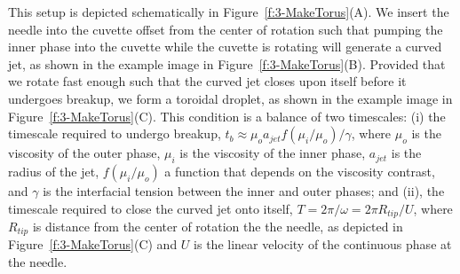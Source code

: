 This setup is depicted schematically in Figure~\ref{f:3-MakeTorus}(A).
We insert the needle into the cuvette offset from the center of rotation such that pumping the inner phase into the cuvette while the cuvette is rotating will generate a curved jet, as shown in the example image in Figure~\ref{f:3-MakeTorus}(B).
Provided that we rotate fast enough such that the curved jet closes upon itself before it undergoes breakup, we form a toroidal droplet, as shown in the example image in Figure~\ref{f:3-MakeTorus}(C).
This condition is a balance of two timescales: (i) the timescale required to undergo breakup, $t_b \approx \mu_o a_{jet} f(\mu_i/\mu_o)/\gamma$, where $\mu_o$ is the viscosity of the outer phase, $\mu_i$ is the viscosity of the inner phase, $a_{jet}$ is the radius of the jet, $f(\mu_i/\mu_o)$ a function that depends on the viscosity contrast, and $\gamma$ is the interfacial tension between the inner and outer phases;
  and (ii), the timescale required to close the curved jet onto itself, $T = 2\pi/\omega = 2 \pi R_{tip}/U$, where $R_{tip}$ is distance from the center of rotation the the needle, as depicted in Figure~\ref{f:3-MakeTorus}(C) and $U$ is the linear velocity of the continuous phase at the needle.

